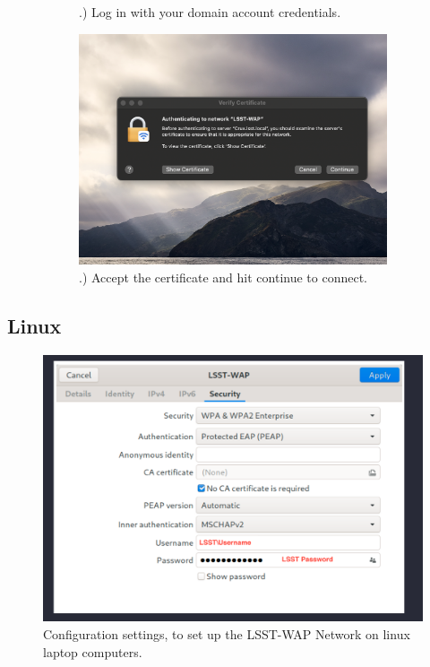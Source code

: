 \begin{figure}
\begin{subfigure}{0.40\textwidth}
      .) Log in with your domain account credentials.
    \end{subfigure}
      \hfill
      \vspace{7mm}
    \begin{subfigure}{0.50\textwidth}
      \includegraphics[width=\textwidth]{Images/Mac4.png}
      .) Accept the certificate and hit continue to connect.
    \end{subfigure}
  \end{figure}

\newpage

  \subsection{Linux}
  \vspace{20mm}
  \begin{figure}
    \centering
    \includegraphics[width=150mm]{Images/Linux2.png}
    \centering
    Configuration settings, to set up the LSST-WAP Network on linux laptop computers.
  \end{figure}

